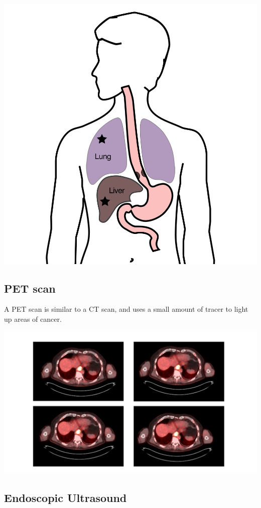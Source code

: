 \documentclass[
  letterpaper,
  DIV=11,
  numbers=noendperiod]{scrartcl}
\begin{document}
\includegraphics{christmas2004_files/mediabag/Eso_M_Stage.png}

\subsection{PET scan}\label{pet-scan}

A PET scan is similar to a CT scan, and uses a small amount of tracer to
light up areas of cancer.

\includegraphics{christmas2004_files/mediabag/PetImage.png}

\subsection{Endoscopic Ultrasound}\label{endoscopic-ultrasound}
\end{document}
